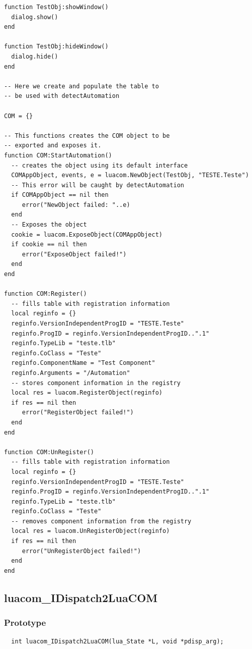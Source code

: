 \documentclass[11pt,a4paper,english]{report}
\begin{document}
\begin{verbatim}
function TestObj:showWindow()
  dialog.show()
end

function TestObj:hideWindow()
  dialog.hide()
end

-- Here we create and populate the table to
-- be used with detectAutomation

COM = {}

-- This functions creates the COM object to be
-- exported and exposes it.
function COM:StartAutomation()
  -- creates the object using its default interface
  COMAppObject, events, e = luacom.NewObject(TestObj, "TESTE.Teste")
  -- This error will be caught by detectAutomation
  if COMAppObject == nil then
     error("NewObject failed: "..e)
  end
  -- Exposes the object
  cookie = luacom.ExposeObject(COMAppObject)
  if cookie == nil then
     error("ExposeObject failed!")
  end
end

function COM:Register()
  -- fills table with registration information
  local reginfo = {}
  reginfo.VersionIndependentProgID = "TESTE.Teste"
  reginfo.ProgID = reginfo.VersionIndependentProgID..".1"
  reginfo.TypeLib = "teste.tlb"
  reginfo.CoClass = "Teste"
  reginfo.ComponentName = "Test Component"
  reginfo.Arguments = "/Automation"
  -- stores component information in the registry
  local res = luacom.RegisterObject(reginfo)
  if res == nil then
     error("RegisterObject failed!")
  end
end

function COM:UnRegister()
  -- fills table with registration information
  local reginfo = {}
  reginfo.VersionIndependentProgID = "TESTE.Teste"
  reginfo.ProgID = reginfo.VersionIndependentProgID..".1"
  reginfo.TypeLib = "teste.tlb"
  reginfo.CoClass = "Teste"
  -- removes component information from the registry
  local res = luacom.UnRegisterObject(reginfo)
  if res == nil then
     error("UnRegisterObject failed!")
  end
end

\end{verbatim}


\subsection*{luacom\_IDispatch2LuaCOM}

\subsubsection*{Prototype}

\begin{verbatim}
  int luacom_IDispatch2LuaCOM(lua_State *L, void *pdisp_arg);
\end{verbatim}
\end{document}
